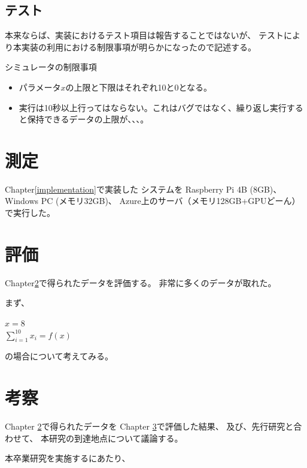 \documentclass[senior,final,11pt]{iputde-thesis}
\begin{document}
\section{テスト}

本来ならば、実装におけるテスト項目は報告することではないが、
テストにより本実装の利用における制限事項が明らかになったので記述する。

シミュレータの制限事項
\begin{itemize}
    \item パラメータ$x$の上限と下限はそれぞれ10と0となる。
    \item 実行は10秒以上行ってはならない。これはバグではなく、繰り返し実行すると保持できるデータの上限が、、、。
\end{itemize}


\chapter{測定}\label{measurement}
Chapter\ref{implementation}で実装した
システムを
Raspberry Pi 4B (8GB)、
Windows PC (メモリ32GB)、
Azure上のサーバ（メモリ128GB+GPUどーん）で実行した。


\chapter{評価}\label{evaluation}

Chapter\ref{measurement}で得られたデータを評価する。
非常に多くのデータが取れた。


まず、
\begin{center}
    $x = 8$ \\
    $\sum_{i=1}^{10} x_i = f(x)$
\end{center}
の場合について考えてみる。



\chapter{考察}\label{discussion}

Chapter \ref{measurement}で得られたデータを
Chapter \ref{evaluation}で評価した結果、
及び、先行研究\cite{4065825}と合わせて、
本研究の到達地点について議論する。




\begin{acknowledge}
本卒業研究を実施するにあたり、
\end{acknowledge}
\end{document}
